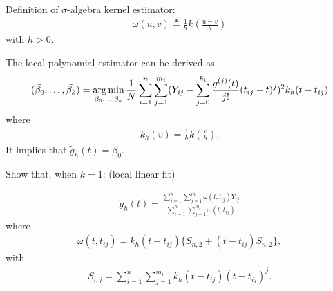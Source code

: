 \documentclass[UTF8,a4paper,10pt]{article}
\begin{document}
\begin{mybox}{Definition of \(\sigma\)-algebra}
  kernel estimator: 
  \begin{equation*}
    \begin{aligned}
      \omega(u,v)\triangleq \frac{1}{h}k(\frac{u-v}{h})
    \end{aligned}
  \end{equation*}
  with \(h>0\).
  


\end{mybox}




  \begin{Problem}[]{}

    The local polynomial estimator can be derived as 
    \begin{equation*}
      \begin{aligned}
        (\tilde{\beta_0},\ldots,\tilde{\beta_k}) = \operatorname*{arg\,min}_{\beta_0,\ldots,\beta_k} \frac{1}{N}\sum_{i=1}^{n}\sum_{j=1}^{m_i} (Y_{ij}-\sum_{j=0}^{k_i}\frac{g^{(j)}(t)}{j!}(t_{ij}-t)^{j})^2k_{h}(t-t_{ij}) 
      \end{aligned}
    \end{equation*}
    where
    \begin{equation*}
      \begin{aligned}
        k_{h}(v) = \frac{1}{h}k(\frac{v}{h}).
      \end{aligned}
    \end{equation*}
    It implies that \(\tilde{g}_h(t) = \tilde{\beta}_0\).

    Show that, when \(k=1\): (local linear fit)

    \begin{equation*}
      \begin{aligned}
        \tilde{g}_h(t) = \frac{\sum_{i=1}^{n}\sum_{j=1}^{m_i}\omega(t,t_{ij})Y_{ij}}{\sum_{i=1}^{n}\sum_{j=1}^{m_i}\omega(t,t_{ij})}
      \end{aligned}
    \end{equation*}
    where
    \begin{equation*}
      \begin{aligned}
        \omega(t,t_{ij}) = k_h(t-t_{ij})\{S_{n,2}+(t-t_{ij})S_{n,2}\},
      \end{aligned}
    \end{equation*}
    with
    \begin{equation*}
      \begin{aligned}
        S_{i,j} = \sum_{i=1}^{n}\sum_{j=1}^{m_i} k_h(t-t_{ij})(t-t_{ij})^j.
      \end{aligned}
    \end{equation*}
  \end{Problem}
\end{document}
